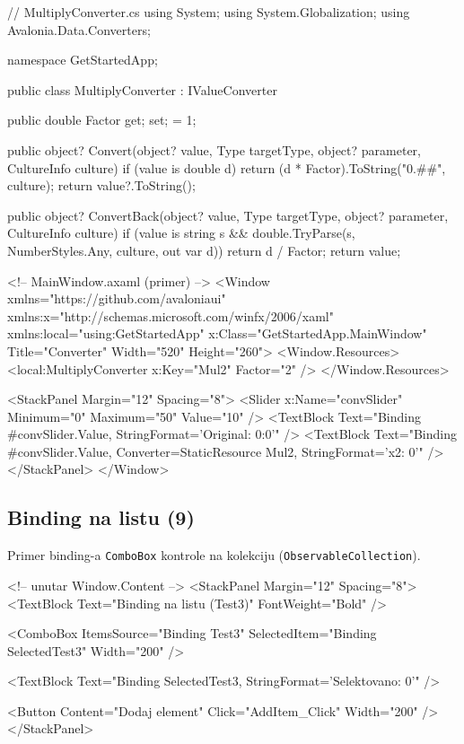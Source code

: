 \documentclass[11pt,a4paper]{article}
\begin{document}
\begin{CodeBlock}
// MultiplyConverter.cs
using System;
using System.Globalization;
using Avalonia.Data.Converters;

namespace GetStartedApp;

public class MultiplyConverter : IValueConverter
{
    public double Factor { get; set; } = 1;

    public object? Convert(object? value, Type targetType, object? parameter, CultureInfo culture)
    {
        if (value is double d)
            return (d * Factor).ToString("0.##", culture);
        return value?.ToString();
    }

    public object? ConvertBack(object? value, Type targetType, object? parameter, CultureInfo culture)
    {
        if (value is string s && double.TryParse(s, NumberStyles.Any, culture, out var d))
            return d / Factor;
        return value;
    }
}
\end{CodeBlock}

\begin{CodeBlock}
<!-- MainWindow.axaml (primer) -->
<Window xmlns="https://github.com/avaloniaui"
        xmlns:x="http://schemas.microsoft.com/winfx/2006/xaml"
        xmlns:local="using:GetStartedApp"
        x:Class="GetStartedApp.MainWindow"
        Title="Converter" Width="520" Height="260">
  <Window.Resources>
    <local:MultiplyConverter x:Key="Mul2" Factor="2" />
  </Window.Resources>

  <StackPanel Margin="12" Spacing="8">
    <Slider x:Name="convSlider" Minimum="0" Maximum="50" Value="10" />
    <TextBlock Text="{Binding #convSlider.Value, StringFormat='Original: {0:0}'}" />
    <TextBlock Text="{Binding #convSlider.Value, Converter={StaticResource Mul2}, StringFormat='x2: {0}'}" />
  </StackPanel>
</Window>
\end{CodeBlock}

\subsection{Binding na listu (9)}
Primer binding-a \texttt{ComboBox} kontrole na kolekciju (\texttt{ObservableCollection}).

\begin{CodeBlock}
<!-- unutar Window.Content -->
<StackPanel Margin="12" Spacing="8">
  <TextBlock Text="Binding na listu (Test3)" FontWeight="Bold" />

  <ComboBox ItemsSource="{Binding Test3}"
            SelectedItem="{Binding SelectedTest3}"
            Width="200" />

  <TextBlock Text="{Binding SelectedTest3, StringFormat='Selektovano: {0}'}" />

  <Button Content="Dodaj element" Click="AddItem_Click" Width="200" />
</StackPanel>
\end{CodeBlock}
\end{document}
